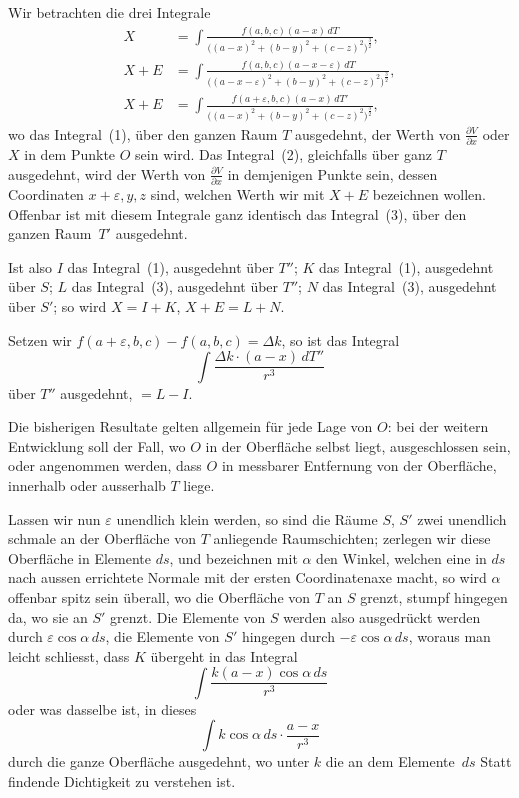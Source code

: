 \documentclass[12pt,a4paper]{article}
\begin{document}
Wir betrachten die drei Integrale
\begin{align*}
\tag{1}
X &= \int\frac{f(a,b,c)(a-x)\,dT}{\bigl((a-x)^2+(b-y)^2+(c-z)^2\bigr)^{\frac{3}{2}}},\\
\tag{2}
X+E &= \int\frac{f(a,b,c)(a-x-\varepsilon)\,dT}{\bigl((a-x-\varepsilon)^2+(b-y)^2+(c-z)^2\bigr)^{\frac{3}{2}}},\\
\tag{3}
X+E &= \int\frac{f(a+\varepsilon,b,c)(a-x)\,dT'}{\bigl((a-x)^2+(b-y)^2+(c-z)^2\bigr)^{\frac{3}{2}}},
\end{align*}
wo das Integral~(1), über den ganzen Raum $T$ ausgedehnt, der Werth von
$\tfrac{\partial V}{\partial x}$ oder $X$ in dem Punkte $O$ sein wird. Das Integral~(2), gleichfalls über ganz $T$ ausgedehnt, wird der Werth von $\tfrac{\partial V}{\partial x}$ in demjenigen Punkte sein, dessen Coordinaten
$x+\varepsilon,y,z$ sind, welchen Werth wir mit $X+E$ bezeichnen wollen. Offenbar
ist mit diesem Integrale ganz identisch das Integral~(3), über den ganzen Raum~$T'$
ausgedehnt.

Ist also $I$ das Integral~(1), ausgedehnt über $T''$; $K$ das Integral~(1), ausgedehnt über $S$; $L$ das Integral~(3), ausgedehnt über $T''$; $N$ das Integral~(3), ausgedehnt über $S'$; so wird $X = I+K$, $X+E = L+N$.

Setzen wir $f(a+\varepsilon,b,c)-f(a,b,c) = \Delta k$, so ist das Integral
\begin{equation*}
\tag{4}
\int\frac{\Delta k\cdot(a-x)\,dT''}{r^3}
\end{equation*}
über $T''$ ausgedehnt, $=L-I$.

Die bisherigen Resultate gelten allgemein für jede Lage von $O$: bei der
weitern Entwicklung soll der Fall, wo $O$ in der Oberfläche selbst liegt, ausgeschlossen
sein, oder angenommen werden, dass $O$ in messbarer Entfernung von
der Oberfläche, innerhalb oder ausserhalb $T$ liege.

Lassen wir nun $\varepsilon$ unendlich klein werden, so sind die Räume $S$, $S'$ zwei
unendlich schmale an der Oberfläche von $T$ anliegende Raumschichten; zerlegen
wir diese Oberfläche in Elemente $ds$, und bezeichnen mit $\alpha$ den Winkel, welchen
eine in $ds$ nach aussen errichtete Normale mit der ersten Coordinatenaxe macht,
so wird $\alpha$ offenbar spitz sein überall, wo die Oberfläche von $T$ an $S$ grenzt,
stumpf hingegen da, wo sie an $S'$ grenzt. Die Elemente von $S$ werden also ausgedrückt werden durch $\varepsilon\cos\alpha\,ds$, die Elemente von $S'$ hingegen durch $-\varepsilon\cos\alpha\,ds$,
woraus man leicht schliesst, dass $K$ übergeht in das Integral
\[
\int\frac{k(a-x)\cos\alpha\,ds}{r^3}
\]
oder was dasselbe ist, in dieses
\[
\int k\cos\alpha\,ds\cdot\frac{a-x}{r^3}
\]
durch die ganze Oberfläche ausgedehnt, wo unter $k$ die an dem Elemente~$ds$
Statt findende Dichtigkeit zu verstehen ist.
\end{document}
